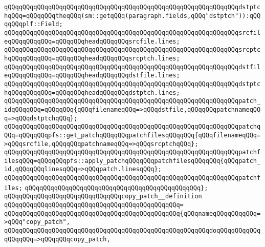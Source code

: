 \verb|qQQqqQQqqQQqqQQqqQQqqQQqqQQqqQQqqQQqqQQqqQQqqQQqqQQqqQQqqQQqqQQqdstptchqQQq=qQQqqQQqtheqQQq(sm::getqQQq(paragraph.fields,qQQq"dstptch")):qQQqqQQqplf::Field;|\newline
\newline
\verb|qQQqqQQqqQQqqQQqqQQqqQQqqQQqqQQqqQQqqQQqqQQqqQQqqQQqqQQqqQQqqQQqsrcfileqQQqqQQqqQQq=qQQqqQQqheadqQQqqQQqsrcfile.lines;|\newline
\verb|qQQqqQQqqQQqqQQqqQQqqQQqqQQqqQQqqQQqqQQqqQQqqQQqqQQqqQQqqQQqqQQqsrcptchqQQqqQQqqQQq=qQQqqQQqheadqQQqqQQqsrcptch.lines;|\newline
\newline
\verb|qQQqqQQqqQQqqQQqqQQqqQQqqQQqqQQqqQQqqQQqqQQqqQQqqQQqqQQqqQQqqQQqdstfileqQQqqQQqqQQq=qQQqqQQqheadqQQqqQQqdstfile.lines;|\newline
\verb|qQQqqQQqqQQqqQQqqQQqqQQqqQQqqQQqqQQqqQQqqQQqqQQqqQQqqQQqqQQqqQQqdstptchqQQqqQQqqQQq=qQQqqQQqheadqQQqqQQqdstptch.lines;|\newline
\newline
\verb|qQQqqQQqqQQqqQQqqQQqqQQqqQQqqQQqqQQqqQQqqQQqqQQqqQQqqQQqqQQqqQQqpatch_idqQQqqQQq=qQQqqQQq{qQQqfilenameqQQq=>qQQqdstfile,qQQqqQQqpatchnameqQQq=>qQQqdstptchqQQq};|\newline
\newline
\verb|qQQqqQQqqQQqqQQqqQQqqQQqqQQqqQQqqQQqqQQqqQQqqQQqqQQqqQQqqQQqqQQqpatchqQQq=qQQqqQQqpfs::get_patchqQQqqQQqpatchfilesqQQqqQQq{qQQqfilenameqQQq=>qQQqsrcfile,qQQqqQQqpatchnameqQQq=>qQQqsrcptchqQQq};|\newline
\newline
\verb|qQQqqQQqqQQqqQQqqQQqqQQqqQQqqQQqqQQqqQQqqQQqqQQqqQQqqQQqqQQqqQQqpatchfilesqQQq=qQQqqQQqpfs::apply_patchqQQqqQQqpatchfilesqQQqqQQq{qQQqpatch_id,qQQqqQQqlinesqQQq=>qQQqpatch.linesqQQq};|\newline
\newline
\verb|qQQqqQQqqQQqqQQqqQQqqQQqqQQqqQQqqQQqqQQqqQQqqQQqqQQqqQQqqQQqqQQqpatchfiles;|\newline
\verb|qQQqqQQqqQQqqQQqqQQqqQQqqQQqqQQqqQQqqQQqqQQqqQQq};|\newline
\newline
\verb|qQQqqQQqqQQqqQQqqQQqqQQqqQQqqQQqcopy_patch__definition|\newline
\verb|qQQqqQQqqQQqqQQqqQQqqQQqqQQqqQQqqQQqqQQqqQQqqQQq=|\newline
\verb|qQQqqQQqqQQqqQQqqQQqqQQqqQQqqQQqqQQqqQQqqQQqqQQq{qQQqnameqQQqqQQqqQQq=>qQQq"copy_patch",|\newline
\verb|qQQqqQQqqQQqqQQqqQQqqQQqqQQqqQQqqQQqqQQqqQQqqQQqqQQqqQQqdoqQQqqQQqqQQqqQQqqQQq=>qQQqqQQqcopy_patch,|\newline

